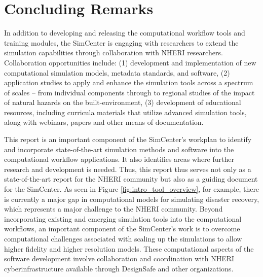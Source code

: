 \section{Concluding Remarks}

In addition to developing and releasing the computational workflow tools and training modules, the SimCenter is engaging with researchers to extend the simulation capabilities through collaboration with NHERI researchers. Collaboration opportunities include: (1) development and implementation of new computational simulation models, metadata standards, and software, (2) application studies to apply and enhance the simulation tools across a spectrum of scales – from individual components through to regional studies of the impact of natural hazards on the built-environment, (3) development of educational resources, including curricula materials that utilize advanced simulation tools, along with webinars, papers and other means of documentation. 

This report is an important component of the SimCenter’s workplan to identify and incorporate state-of-the-art simulation methods and software into the computational workflow applications. It also identifies areas where further research and development is needed.  Thus, this report thus serves not only as a state-of-the-art report for the NHERI community but also as a guiding document for the SimCenter.  As seen in Figure \ref{fig:intro_tool_overview}, for example, there is currently a major gap in computational models for simulating disaster recovery, which represents a major challenge to the NHERI community.  Beyond incorporating existing and emerging simulation tools into the computational workflows, an important component of the SimCenter’s work is to overcome computational challenges associated with scaling up the simulations to allow higher fidelity and higher resolution models.  These computational aspects of the software development involve collaboration and coordination with NHERI cyberinfrastructure available through DesignSafe and other organizations. 